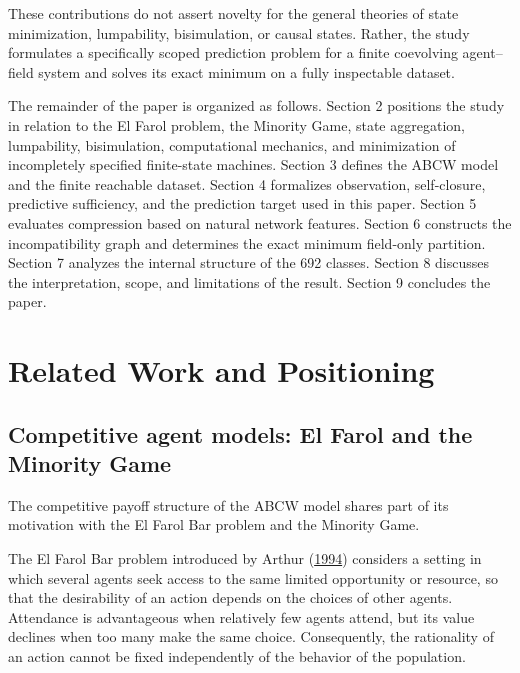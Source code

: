 \documentclass[
  11pt,
]{article}
\begin{document}
These contributions do not assert novelty for the general theories of
state minimization, lumpability, bisimulation, or causal states. Rather,
the study formulates a specifically scoped prediction problem for a
finite coevolving agent--field system and solves its exact minimum on a
fully inspectable dataset.

The remainder of the paper is organized as follows. Section 2 positions
the study in relation to the El Farol problem, the Minority Game, state
aggregation, lumpability, bisimulation, computational mechanics, and
minimization of incompletely specified finite-state machines. Section 3
defines the ABCW model and the finite reachable dataset. Section 4
formalizes observation, self-closure, predictive sufficiency, and the
prediction target used in this paper. Section 5 evaluates compression
based on natural network features. Section 6 constructs the
incompatibility graph and determines the exact minimum field-only
partition. Section 7 analyzes the internal structure of the 692 classes.
Section 8 discusses the interpretation, scope, and limitations of the
result. Section 9 concludes the paper.

\hypertarget{related-work-and-positioning}{%
\section{Related Work and
Positioning}\label{related-work-and-positioning}}

\hypertarget{competitive-agent-models-el-farol-and-the-minority-game}{%
\subsection{Competitive agent models: El Farol and the Minority
Game}\label{competitive-agent-models-el-farol-and-the-minority-game}}

The competitive payoff structure of the ABCW model shares part of its
motivation with the El Farol Bar problem and the Minority Game.

The El Farol Bar problem introduced by Arthur
(\protect\hyperlink{ref-arthur1994}{1994}) considers a setting in which
several agents seek access to the same limited opportunity or resource,
so that the desirability of an action depends on the choices of other
agents. Attendance is advantageous when relatively few agents attend,
but its value declines when too many make the same choice. Consequently,
the rationality of an action cannot be fixed independently of the
behavior of the population.
\end{document}
